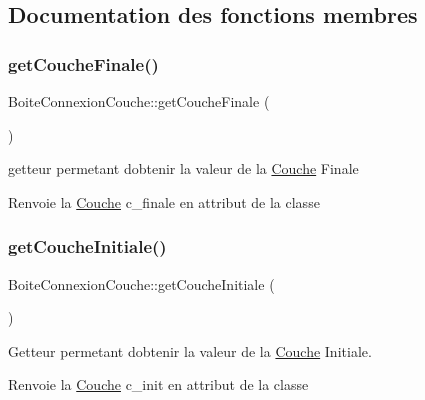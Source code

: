 \subsection{Documentation des fonctions membres}
\mbox{\label{class_boite_connexion_couche_af35c756dfc1f9491e2803b251f2d4434}} 
\subsubsection{\texorpdfstring{get\+Couche\+Finale()}{getCoucheFinale()}}
{\footnotesize\ttfamily Boite\+Connexion\+Couche\+::get\+Couche\+Finale (\begin{DoxyParamCaption}{ }\end{DoxyParamCaption})}



getteur permetant d\textquotesingle{}obtenir la valeur de la \hyperlink{class_couche}{Couche} Finale 

\begin{DoxyReturn}{Renvoie}
la \hyperlink{class_couche}{Couche} c\+\_\+finale en attribut de la classe 
\end{DoxyReturn}
\mbox{\label{class_boite_connexion_couche_a3b0faf67baf198a1abaafc7c469fc6d2}} 
\subsubsection{\texorpdfstring{get\+Couche\+Initiale()}{getCoucheInitiale()}}
{\footnotesize\ttfamily Boite\+Connexion\+Couche\+::get\+Couche\+Initiale (\begin{DoxyParamCaption}{ }\end{DoxyParamCaption})}



Getteur permetant d\textquotesingle{}obtenir la valeur de la \hyperlink{class_couche}{Couche} Initiale. 

\begin{DoxyReturn}{Renvoie}
la \hyperlink{class_couche}{Couche} c\+\_\+init en attribut de la classe 
\end{DoxyReturn}
\mbox{\label{class_boite_connexion_couche_a9469138a3db603eddacf8757595ad6cf}} 
